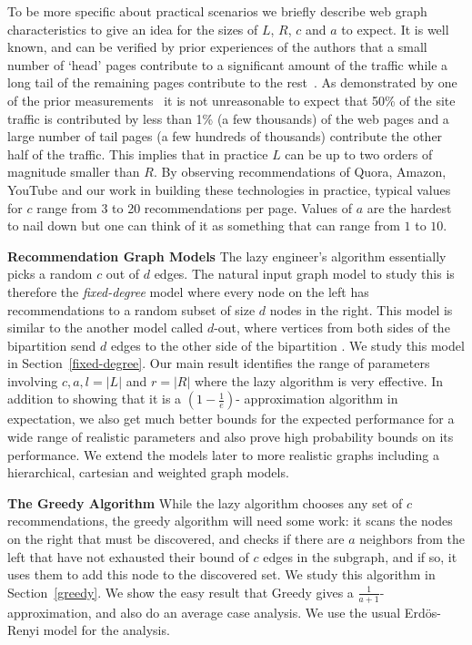 To be more specific about practical scenarios we briefly describe
web graph characteristics to give an idea for the sizes of $L$,
$R$, $c$ and $a$ to expect. It is well known, and can be verified by
prior experiences of the authors that a small number of `head' pages contribute to a
significant amount of the traffic while a long tail of the remaining
pages contribute to the rest~\cite{HubermanAdamic1999, DuDemmerBrewer2006}. As
demonstrated by one of the prior measurements~\cite{KumarNorrisSun2009}
it is not unreasonable to expect that 50\% of the site traffic is
contributed by less than 1\% (a few thousands) of the web pages and a
large number of tail pages (a few hundreds of thousands) contribute
the other half of the traffic. This implies that in practice $L$ can
be up to two orders of magnitude smaller than $R$.  By observing
recommendations of Quora, Amazon, YouTube and our work in building
these technologies in practice, typical values for $c$ range from 3 to
20 recommendations per page. Values of $a$ are the hardest to nail
down but one can think of it as something that can range from $1$ to
$10$. \vs

\noindent
{\bf Recommendation Graph Models} The lazy engineer's algorithm
essentially picks a random $c$ out of $d$ edges. The natural input graph model to
study this is therefore the {\em
 fixed-degree} model where every
node on the left has recommendations to a random subset of size $d$
nodes in the right. This model is similar to the another model called
$d$-out, where vertices from both sides of the bipartition send $d$
edges to the other side of the bipartition \cite{FriezePittel2004}. We
study this model in Section~\ref{fixed-degree}. Our main result
identifies the range of parameters involving $c,a,l=|L|$ and $r =|R|$
where the lazy algorithm is very effective. In addition to showing
that it is a $(1-\frac1e)$- approximation algorithm in expectation,
we
 also get much better bounds for the expected performance for a
wide
 range of realistic parameters and also prove high probability
bounds
 on its performance. We extend the models later to more
realistic
 graphs including a hierarchical, cartesian and weighted
graph
 models. \vs

\noindent
{\bf The Greedy Algorithm} While the lazy algorithm chooses any set of $c$ recommendations, the 
greedy algorithm will need some work: it scans the nodes on the right that must
be discovered, and checks if there are $a$ neighbors from the left that have
not exhausted their bound of $c$ edges in the subgraph, and if so, it uses them to
add this node to the discovered set. We study this algorithm in Section~\ref{greedy}. 
We show the easy result that Greedy gives a $\frac{1}{a+1}$-approximation, 
and also do an average case analysis. We
use the usual Erd\"os-Renyi model\cite{ErdosRenyi59} for the analysis.


